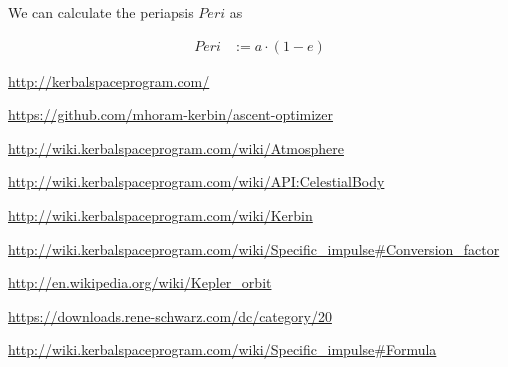 \documentclass[11pt]{article}
\begin{document}
We can calculate the periapsis $Peri$ as

\begin{align}
Peri & := a \cdot (1 - e)
\end{align}

\begin{thebibliography}{Kerbin}

  \url{http://kerbalspaceprogram.com/}

  \url{https://github.com/mhoram-kerbin/ascent-optimizer}

  \url{http://wiki.kerbalspaceprogram.com/wiki/Atmosphere}

  \url{http://wiki.kerbalspaceprogram.com/wiki/API:CelestialBody}

  \url{http://wiki.kerbalspaceprogram.com/wiki/Kerbin}

  \url{http://wiki.kerbalspaceprogram.com/wiki/Specific_impulse#Conversion_factor}

  \url{http://en.wikipedia.org/wiki/Kepler_orbit}

  \url{https://downloads.rene-schwarz.com/dc/category/20}

  \url{http://wiki.kerbalspaceprogram.com/wiki/Specific_impulse#Formula}

\end{thebibliography}
\end{document}
